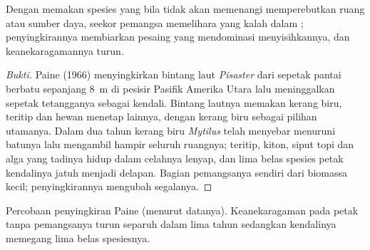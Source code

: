 \begin{proposition}\label{prop:b1:species-interactions:paine}
Dengan memakan spesies yang bila tidak akan memenangi 
memperebutkan ruang atau sumber daya, seekor pemangsa memelihara yang
kalah dalam ; penyingkirannya membiarkan pesaing yang
mendominasi menyisihkannya, dan keanekaragamannya turun.
\end{proposition}
\begin{proof}[Bukti]
Paine (1966) menyingkirkan bintang laut \emph{Pisaster} dari sepetak
pantai berbatu sepanjang \qty{8}{m} di pesisir Pasifik Amerika Utara
lalu meninggalkan sepetak tetangganya sebagai kendali. Bintang lautnya
memakan kerang biru, teritip dan hewan menetap lainnya, dengan kerang
biru sebagai pilihan utamanya. Dalam dua tahun kerang biru
\emph{Mytilus} telah menyebar menuruni batunya lalu mengambil hampir
seluruh ruangnya; teritip, kiton, siput topi dan alga yang tadinya
hidup dalam celahnya lenyap, dan lima belas spesies petak kendalinya
jatuh menjadi delapan. Bagian pemangsanya sendiri dari biomassa
 kecil; penyingkirannya mengubah segalanya.
\end{proof}

\begin{omfigure}

{\small Percobaan penyingkiran Paine (menurut datanya). Keanekaragaman
pada petak tanpa pemangsanya turun separuh dalam lima tahun sedangkan
kendalinya memegang lima belas spesiesnya.}
\end{omfigure}

